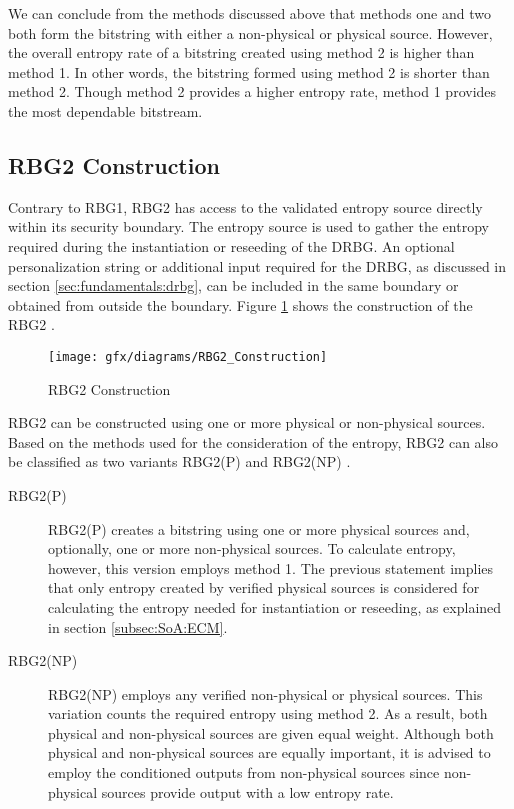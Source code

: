 We can conclude from the methods discussed above that methods one and two both form the bitstring with either a non-physical or physical source. However, the overall entropy rate of a bitstring created using method 2 is higher than method 1. In other words, the bitstring formed using method 2 is shorter than method 2. Though method 2 provides a higher entropy rate, method 1 provides the most dependable bitstream.

%
%
\subsection{RBG2 Construction}
\label{subsec:SoA:RBG2}
Contrary to RBG1, RBG2 has access to the validated entropy source directly within its security boundary. The entropy source is used to gather the entropy required during the instantiation or reseeding of the DRBG. An optional personalization string or additional input required for the DRBG, as discussed in section \ref{sec:fundamentals:drbg}, can be included in the same boundary or obtained from outside the boundary. Figure \ref{fig:3:3} shows the construction of the RBG2 \cite{SP90C-2022}.

\begin{figure}[htbp]
	\centering
	\texttt{[image: gfx/diagrams/RBG2\_Construction]}
	\caption{RBG2 Construction \cite{SP90C-2022}}
	\label{fig:3:3}
\end{figure}

RBG2 can be constructed using one or more physical or non-physical sources. Based on the methods used for the consideration of the entropy, RBG2 can also be classified as two variants RBG2(P) and RBG2(NP) \cite{SP90C-2022}.

\begin{description}
	\item[RBG2(P)] RBG2(P) creates a bitstring using one or more physical sources and, optionally, one or more non-physical sources. To calculate entropy, however, this version employs method 1. The previous statement implies that only entropy created by verified physical sources is considered for calculating the entropy needed for instantiation or reseeding, as explained in section \ref{subsec:SoA:ECM}.
	
	\item[RBG2(NP)] RBG2(NP) employs any verified non-physical or physical sources. This variation counts the required entropy using method 2. As a result, both physical and non-physical sources are given equal weight. Although both physical and non-physical sources are equally important, it is advised to employ the conditioned outputs from non-physical sources since non-physical sources provide output with a low entropy rate.
\end{description}

